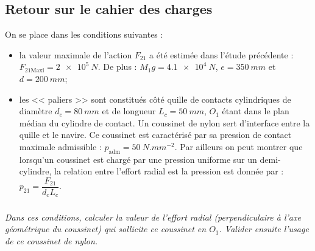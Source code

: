 \documentclass[10pt,fleqn]{article} %
\begin{document}
\begin{multicols}{2}
\subsection*{Retour sur le cahier des charges}
On se place dans les conditions suivantes :
\begin{itemize}
\item la valeur maximale de l’action $F_{21}$ a été estimée dans l’étude précédente : $F_{21\text{Maxi}}=\SI{2e5}{N}$. De
plus : $M_1 g = \SI{4,1e4}{N}$, $e=\SI{350}{mm}$ et $d=\SI{200}{mm}$;
\item les << paliers >> sont constitués côté quille de contacts cylindriques de diamètre $d_c =\SI{80}{mm}$ et de longueur $L_c =\SI{50}{mm}$, $O_1$ étant dans le plan médian du cylindre de contact. Un coussinet de nylon
sert d’interface entre la quille et le navire. Ce coussinet est caractérisé par sa pression de contact
maximale admissible : $p_{\text{adm}}= \SI{50}{N.mm^{-2}}$. Par ailleurs on peut montrer que lorsqu'un coussinet est chargé par une pression uniforme sur un demi-cylindre, la relation entre l'effort radial est la pression est donnée par : $p_{21}=\dfrac{F_{21}}{d_cL_c}$.
\end{itemize}

\subparagraph{}\textit{Dans ces conditions, calculer la valeur de l’effort radial (perpendiculaire à l’axe géométrique du coussinet) qui sollicite ce coussinet en $O_1$.
Valider ensuite l’usage de ce coussinet de nylon.}

\ifprof
\else
\end{multicols}
\fi

\end{document}
